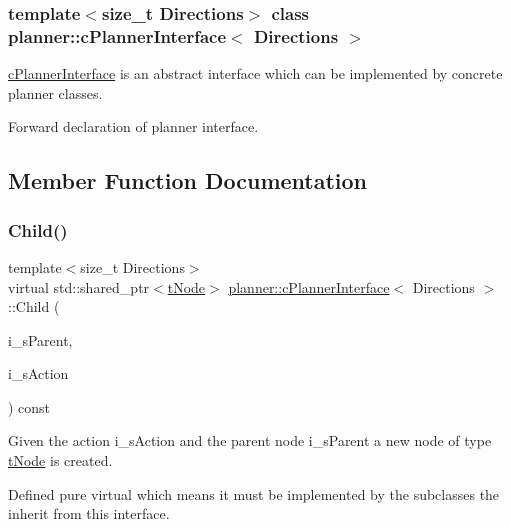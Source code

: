 \subsubsection*{template$<$size\+\_\+t Directions$>$\newline
class planner\+::c\+Planner\+Interface$<$ Directions $>$}

\mbox{\hyperlink{classplanner_1_1c_planner_interface}{c\+Planner\+Interface}} is an abstract interface which can be implemented by concrete planner classes. 

Forward declaration of planner interface. 

\subsection{Member Function Documentation}
\mbox{\label{classplanner_1_1c_planner_interface_a7e2048c2a4c699a76db90d1cbfecf156}} 
\subsubsection{\texorpdfstring{Child()}{Child()}}
{\footnotesize\ttfamily template$<$size\+\_\+t Directions$>$ \\
virtual std\+::shared\+\_\+ptr$<$\mbox{\hyperlink{structplanner_1_1t_node}{t\+Node}}$>$ \mbox{\hyperlink{classplanner_1_1c_planner_interface}{planner\+::c\+Planner\+Interface}}$<$ Directions $>$\+::Child (\begin{DoxyParamCaption}\item[{std\+::shared\+\_\+ptr$<$ \mbox{\hyperlink{structplanner_1_1t_node}{t\+Node}} $>$ \&}]{i\+\_\+s\+Parent,  }\item[{const \mbox{\hyperlink{structplanner_1_1t_action}{t\+Action}} \&}]{i\+\_\+s\+Action }\end{DoxyParamCaption}) const\hspace{0.3cm}{\ttfamily [pure virtual]}}



Given the action i\+\_\+s\+Action and the parent node i\+\_\+s\+Parent a new node of type \mbox{\hyperlink{structplanner_1_1t_node}{t\+Node}} is created. 

Defined pure virtual which means it must be implemented by the subclasses the inherit from this interface. 

